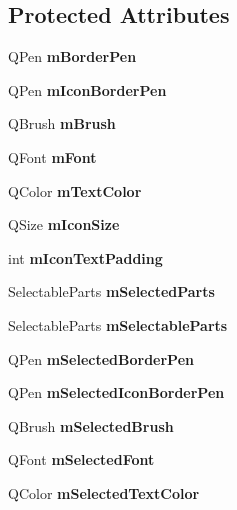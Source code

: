 \subsection*{Protected Attributes}
\begin{DoxyCompactItemize}
\item 
\hypertarget{class_q_c_p_legend_a52ab8342a382456131d567f962d7f9d0}{}\label{class_q_c_p_legend_a52ab8342a382456131d567f962d7f9d0} 
Q\+Pen {\bfseries m\+Border\+Pen}
\item 
\hypertarget{class_q_c_p_legend_a773ae518c3149fcabff4a2906fdacbc4}{}\label{class_q_c_p_legend_a773ae518c3149fcabff4a2906fdacbc4} 
Q\+Pen {\bfseries m\+Icon\+Border\+Pen}
\item 
\hypertarget{class_q_c_p_legend_a9bd7cd05a9a485e06eda513a348baf80}{}\label{class_q_c_p_legend_a9bd7cd05a9a485e06eda513a348baf80} 
Q\+Brush {\bfseries m\+Brush}
\item 
\hypertarget{class_q_c_p_legend_a56ffacb184a99eefe09a0c7181d0713d}{}\label{class_q_c_p_legend_a56ffacb184a99eefe09a0c7181d0713d} 
Q\+Font {\bfseries m\+Font}
\item 
\hypertarget{class_q_c_p_legend_a478b2d809a7390e9ff8f8bb70d6bd9fe}{}\label{class_q_c_p_legend_a478b2d809a7390e9ff8f8bb70d6bd9fe} 
Q\+Color {\bfseries m\+Text\+Color}
\item 
\hypertarget{class_q_c_p_legend_a39b972aae6c6a3fa5aa73313ab7a5765}{}\label{class_q_c_p_legend_a39b972aae6c6a3fa5aa73313ab7a5765} 
Q\+Size {\bfseries m\+Icon\+Size}
\item 
\hypertarget{class_q_c_p_legend_a8abf8843864ee9afc3f54f906c062240}{}\label{class_q_c_p_legend_a8abf8843864ee9afc3f54f906c062240} 
int {\bfseries m\+Icon\+Text\+Padding}
\item 
\hypertarget{class_q_c_p_legend_a917a34dd2856baafd8d56852d94d00e2}{}\label{class_q_c_p_legend_a917a34dd2856baafd8d56852d94d00e2} 
Selectable\+Parts {\bfseries m\+Selected\+Parts}
\item 
\hypertarget{class_q_c_p_legend_a179b4d5c1bea723b76e402ff48f0d7fb}{}\label{class_q_c_p_legend_a179b4d5c1bea723b76e402ff48f0d7fb} 
Selectable\+Parts {\bfseries m\+Selectable\+Parts}
\item 
\hypertarget{class_q_c_p_legend_a62906c996906ae23e9f724b6ac1f7334}{}\label{class_q_c_p_legend_a62906c996906ae23e9f724b6ac1f7334} 
Q\+Pen {\bfseries m\+Selected\+Border\+Pen}
\item 
\hypertarget{class_q_c_p_legend_a7429ac0e64c7b90b649b4d8f4cc5fa55}{}\label{class_q_c_p_legend_a7429ac0e64c7b90b649b4d8f4cc5fa55} 
Q\+Pen {\bfseries m\+Selected\+Icon\+Border\+Pen}
\item 
\hypertarget{class_q_c_p_legend_ab3c7567c86d4784b1e48f76a84b3a1e2}{}\label{class_q_c_p_legend_ab3c7567c86d4784b1e48f76a84b3a1e2} 
Q\+Brush {\bfseries m\+Selected\+Brush}
\item 
\hypertarget{class_q_c_p_legend_a86ce8f6c20a2f51a48eaf3c24ce16805}{}\label{class_q_c_p_legend_a86ce8f6c20a2f51a48eaf3c24ce16805} 
Q\+Font {\bfseries m\+Selected\+Font}
\item 
\hypertarget{class_q_c_p_legend_a6c25c8796c6e73e983aae6024965f2be}{}\label{class_q_c_p_legend_a6c25c8796c6e73e983aae6024965f2be} 
Q\+Color {\bfseries m\+Selected\+Text\+Color}
\end{DoxyCompactItemize}
